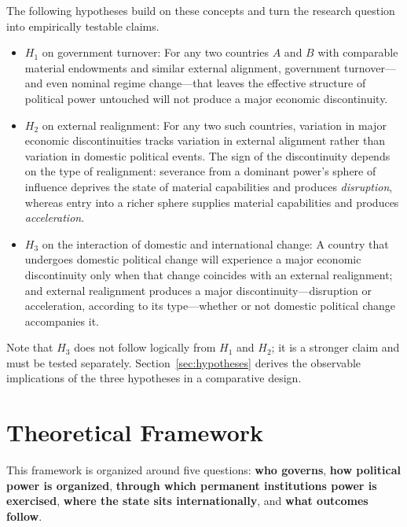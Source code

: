 \documentclass[11pt]{article}
\begin{document}
The following hypotheses build on these concepts and turn the research question into empirically testable claims.

\begin{itemize}
    \item $H_1$ on government turnover: For any two countries $A$ and $B$ with comparable material endowments and similar external alignment, government turnover---and even nominal regime change---that leaves the effective structure of political power untouched will not produce a major economic discontinuity.
    \item $H_2$ on external realignment: For any two such countries, variation in major economic discontinuities tracks variation in external alignment rather than variation in domestic political events. The sign of the discontinuity depends on the type of realignment: severance from a dominant power's sphere of influence deprives the state of material capabilities and produces \emph{disruption}, whereas entry into a richer sphere supplies material capabilities and produces \emph{acceleration}.
    \item $H_3$ on the interaction of domestic and international change: A country that undergoes domestic political change will experience a major economic discontinuity only when that change coincides with an external realignment; and external realignment produces a major discontinuity---disruption or acceleration, according to its type---whether or not domestic political change accompanies it.
\end{itemize}

Note that $H_3$ does not follow logically from $H_1$ and $H_2$; it is a stronger claim and must be tested separately. Section~\ref{sec:hypotheses} derives the observable implications of the three hypotheses in a comparative design.

\section{Theoretical Framework}
\label{sec:framework}

This framework is organized around five questions: \textbf{who governs}, \textbf{how political power is organized}, \textbf{through which permanent institutions power is exercised}, \textbf{where the state sits internationally}, and \textbf{what outcomes follow}.
\end{document}
